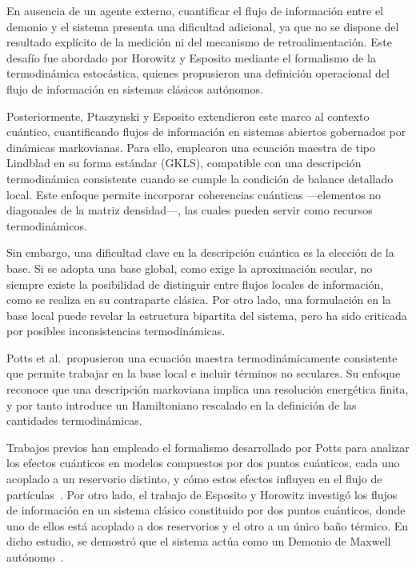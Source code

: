 En ausencia de un agente externo, cuantificar el flujo de información entre el demonio y el sistema presenta una dificultad adicional, ya que no se dispone del resultado explícito de la medición ni del mecanismo de retroalimentación. Este desafío fue abordado por Horowitz y Esposito mediante el formalismo de la termodinámica estocástica\cite{horowitz2014thermodynamics}, quienes propusieron una definición operacional del flujo de información en sistemas clásicos autónomos.

Posteriormente, Ptaszynski y Esposito extendieron este marco al contexto cuántico, cuantificando flujos de información en sistemas abiertos gobernados por dinámicas markovianas\cite{ptaszynski2019thermodynamics}. Para ello, emplearon una ecuación maestra de tipo Lindblad en su forma estándar (GKLS)\cite{gorini1976completely,lindblad1976generators,breuer2002theory}, compatible con una descripción termodinámica consistente cuando se cumple la condición de balance detallado local. Este enfoque permite incorporar coherencias cuánticas —elementos no diagonales de la matriz densidad—, las cuales pueden servir como recursos termodinámicos\cite{ptaszynski2023fermionic,streltsov2017colloquium}.

Sin embargo, una dificultad clave en la descripción cuántica es la elección de la base. Si se adopta una base global, como exige la aproximación secular, no siempre existe la posibilidad de distinguir entre flujos locales de información, como se realiza en su contraparte clásica\cite{horowitz2014thermodynamics}. Por otro lado, una formulación en la base local puede revelar la estructura bipartita del sistema, pero ha sido criticada por posibles inconsistencias termodinámicas\cite{levy2014local,novotny2002investigation}.

Potts et al.\ propusieron una ecuación maestra termodinámicamente consistente que permite trabajar en la base local e incluir términos no seculares\cite{potts2021thermodynamically}. Su enfoque reconoce que una descripción markoviana implica una resolución energética finita, y por tanto introduce un Hamiltoniano rescalado en la definición de las cantidades termodinámicas.

Trabajos previos han empleado el formalismo desarrollado por Potts para analizar los efectos cuánticos en modelos compuestos por dos puntos cuánticos, cada uno acoplado a un reservorio distinto, y cómo estos efectos influyen en el flujo de partículas~\cite{prech2023entanglement}. Por otro lado, el trabajo de Esposito y Horowitz investigó los flujos de información en un sistema clásico constituido por dos puntos cuánticos, donde uno de ellos está acoplado a dos reservorios y el otro a un único baño térmico. En dicho estudio, se demostró que el sistema actúa como un Demonio de Maxwell autónomo~\cite{horowitz2014thermodynamics}.

